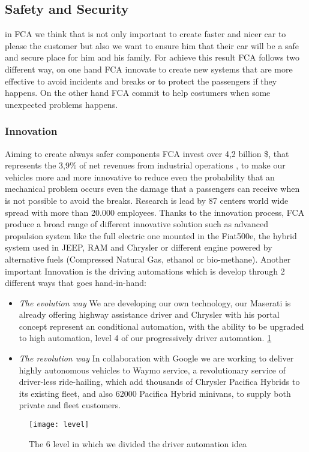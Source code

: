 \subsection{Safety and Security}
in FCA we think that is not only important to create faster and nicer car to please the customer but also we want to ensure him that their car will be a safe and secure place for him and his family. For achieve this result FCA follows two different way, on one hand FCA innovate to create new systems that are more effective to avoid incidents and breaks or to protect the passengers if they happens. On the other hand FCA commit to help costumers when some unexpected problems happens.

\subsubsection{Innovation}
Aiming to create always safer components FCA invest over 4,2 billion \$, that represents the 3,9\% of net revenues from industrial operations \cite{FCASafety}, to make our vehicles more and more innovative to reduce even the probability that an mechanical problem occurs even the damage that a passengers can receive when is not possible to avoid the breaks. Research is lead by 87 centers world wide spread with more than 20.000 employees. Thanks to the innovation process, FCA produce a broad range of different innovative solution such as advanced propulsion system like the full electric one mounted in the Fiat500e, the hybrid system used in JEEP, RAM and Chrysler or different engine powered by alternative fuels (Compressed Natural Gas, ethanol or bio-methane). Another important Innovation is the driving automations which is develop through 2 different ways\cite{FCASD} that goes hand-in-hand:
\begin{itemize}
	\item \textit{The evolution way} We are developing our own technology, our Maserati is already offering highway assistance driver and Chrysler with his portal concept represent an conditional automation, with the ability to be upgraded to high automation, level 4 of our progressively driver automation. \ref{fig:level}
	\item \textit{The revolution way} In collaboration with Google we are working to deliver highly autonomous vehicles to Waymo service, a revolutionary service of driver-less ride-hailing, which add thousands of Chrysler Pacifica Hybrids to its existing fleet, and also 62000 Pacifica Hybrid minivans, to supply both private and fleet customers.
\end{itemize}
     \begin{figure}
     	\centering
     	\texttt{[image: level]}
     	\caption{The 6 level in which we divided the driver automation idea}
     	\label{fig:level}
     \end{figure}
     

